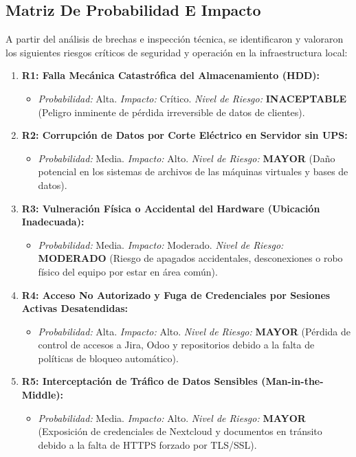 \documentclass[12pt]{article}
\begin{document}
\subsection{Matriz De Probabilidad E Impacto}
A partir del análisis de brechas e inspección técnica, se identificaron y valoraron los siguientes riesgos críticos de seguridad y operación en la infraestructura local:
\begin{enumerate}
    \item \textbf{R1: Falla Mecánica Catastrófica del Almacenamiento (HDD):} 
    \begin{itemize}
        \item \textit{Probabilidad:} Alta. \textit{Impacto:} Crítico. \textit{Nivel de Riesgo:} \textbf{INACEPTABLE} (Peligro inminente de pérdida irreversible de datos de clientes).
    \end{itemize}
    \item \textbf{R2: Corrupción de Datos por Corte Eléctrico en Servidor sin UPS:}
    \begin{itemize}
        \item \textit{Probabilidad:} Media. \textit{Impacto:} Alto. \textit{Nivel de Riesgo:} \textbf{MAYOR} (Daño potencial en los sistemas de archivos de las máquinas virtuales y bases de datos).
    \end{itemize}
    \item \textbf{R3: Vulneración Física o Accidental del Hardware (Ubicación Inadecuada):}
    \begin{itemize}
        \item \textit{Probabilidad:} Media. \textit{Impacto:} Moderado. \textit{Nivel de Riesgo:} \textbf{MODERADO} (Riesgo de apagados accidentales, desconexiones o robo físico del equipo por estar en área común).
    \end{itemize}
    \item \textbf{R4: Acceso No Autorizado y Fuga de Credenciales por Sesiones Activas Desatendidas:}
    \begin{itemize}
        \item \textit{Probabilidad:} Alta. \textit{Impacto:} Alto. \textit{Nivel de Riesgo:} \textbf{MAYOR} (Pérdida de control de accesos a Jira, Odoo y repositorios debido a la falta de políticas de bloqueo automático).
    \end{itemize}
    \item \textbf{R5: Interceptación de Tráfico de Datos Sensibles (Man-in-the-Middle):}
    \begin{itemize}
        \item \textit{Probabilidad:} Media. \textit{Impacto:} Alto. \textit{Nivel de Riesgo:} \textbf{MAYOR} (Exposición de credenciales de Nextcloud y documentos en tránsito debido a la falta de HTTPS forzado por TLS/SSL).
    \end{itemize}
\end{enumerate}
\end{document}
